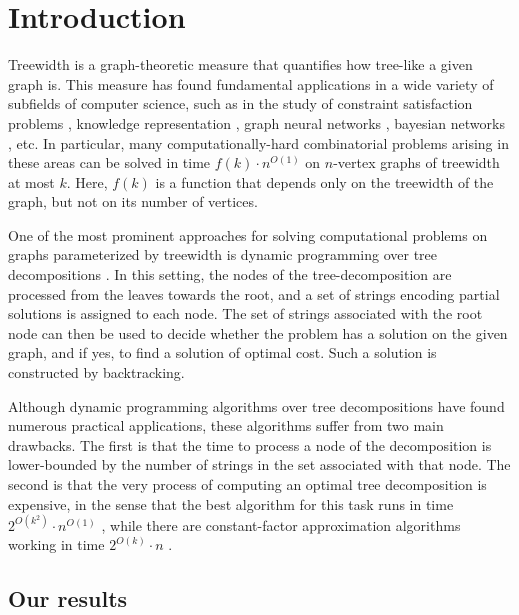 \section{Introduction}
Treewidth is a graph-theoretic measure that quantifies how tree-like a given graph is. This measure has found fundamental applications in a wide variety of subfields of computer science, such as in the study of constraint satisfaction problems \cite{dalmau2002constraint,samer2010constraint}, knowledge representation \cite{gottlob2010bounded}, graph neural networks \cite{barcelo2021graph}, bayesian networks \cite{elidan2008learning}, etc. In particular, many computationally-hard combinatorial problems arising in these areas can be solved in time $f(k)\cdot n^{O(1)}$ on $n$-vertex graphs of treewidth at most $k$. Here, $f(k)$ is a function that depends only on the treewidth of the graph, but not on its number of vertices. 

One of the most prominent approaches for solving computational problems on graphs parameterized by treewidth is dynamic programming over tree decompositions \cite{Baste2022,From2023,hagerup2000dynamic}. In this setting, the nodes of the tree-decomposition are processed from the leaves towards the root, and a set of strings encoding partial solutions is assigned to each node. The set of strings associated with the root node can then be used to decide whether the problem has a solution on the given graph, and if yes, to find a solution of optimal cost. Such a solution is constructed by backtracking. 

Although dynamic programming algorithms over tree decompositions have found numerous practical applications, these algorithms suffer from two main drawbacks. The first is that the time to process a node of the decomposition is lower-bounded by the number of strings in the set associated with that node. The second is that the very process of computing an optimal tree decomposition is expensive, in the sense that the best algorithm for this task runs in time $2^{O(k^2)}\cdot n^{O(1)}$ \cite{korhonen2023improved}, while there are constant-factor approximation algorithms working in time $2^{O(k)}\cdot n$ \cite{korhonen2023single}. 


\subsection{Our results}

